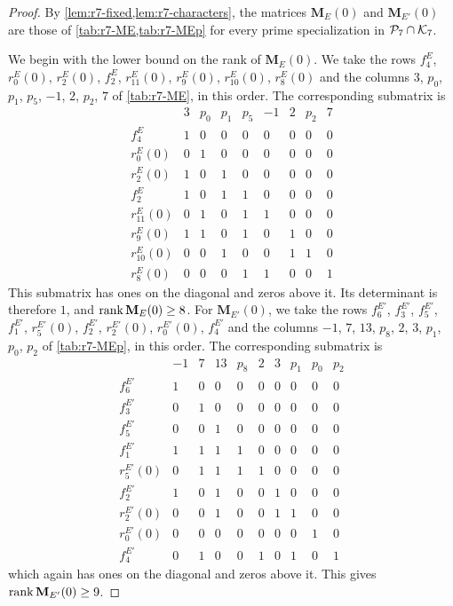 \begin{proof}
By \cref{lem:r7-fixed,lem:r7-characters}, the matrices
$\mathbf M_E(0)$ and $\mathbf M_{E'}(0)$ are those of
\cref{tab:r7-ME,tab:r7-MEp} for every prime specialization in
$\mathcal P_7\cap\mathcal K_7$.

We begin with the lower bound on the rank of $\mathbf M_E(0)$. We take the
rows $f^E_4$, $r^E_0(0)$, $r^E_2(0)$, $f^E_2$, $r^E_{11}(0)$, $r^E_9(0)$,
$r^E_{10}(0)$, $r^E_8(0)$ and the
columns $3$, $p_0$, $p_1$, $p_5$, $-1$, $2$, $p_2$, $7$ of
\cref{tab:r7-ME}, in this order. The corresponding submatrix is
\[
\begin{array}{c|cccccccc}
 & 3 & p_0 & p_1 & p_5 & -1 & 2 & p_2 & 7\\\hline
f^E_4 & 1 & 0 & 0 & 0 & 0 & 0 & 0 & 0 \\
r^{E}_0(0) & 0 & 1 & 0 & 0 & 0 & 0 & 0 & 0 \\
r^{E}_2(0) & 1 & 0 & 1 & 0 & 0 & 0 & 0 & 0 \\
f^E_2 & 1 & 0 & 1 & 1 & 0 & 0 & 0 & 0 \\
r^{E}_{11}(0) & 0 & 1 & 0 & 1 & 1 & 0 & 0 & 0 \\
r^{E}_9(0) & 1 & 1 & 0 & 1 & 0 & 1 & 0 & 0 \\
r^{E}_{10}(0) & 0 & 0 & 1 & 0 & 0 & 1 & 1 & 0 \\
r^{E}_8(0) & 0 & 0 & 0 & 1 & 1 & 0 & 0 & 1
\end{array}
\]
This submatrix has ones on the diagonal and zeros above it. Its
determinant is therefore $1$, and $\operatorname{rank}\mathbf M_E(0)\ge8$. For $\mathbf M_{E'}(0)$, we
take the rows $f^{E'}_6$, $f^{E'}_3$, $f^{E'}_5$, $f^{E'}_1$, $r^{E'}_5(0)$,
$f^{E'}_2$, $r^{E'}_2(0)$, $r^{E'}_0(0)$, $f^{E'}_4$ and the columns $-1$, $7$, $13$, $p_8$,
$2$, $3$, $p_1$, $p_0$, $p_2$ of \cref{tab:r7-MEp}, in this order. The
corresponding submatrix is
\[
\begin{array}{c|ccccccccc}
 & -1 & 7 & 13 & p_8 & 2 & 3 & p_1 & p_0 & p_2\\\hline
f^{E'}_6 & 1 & 0 & 0 & 0 & 0 & 0 & 0 & 0 & 0 \\
f^{E'}_3 & 0 & 1 & 0 & 0 & 0 & 0 & 0 & 0 & 0 \\
f^{E'}_5 & 0 & 0 & 1 & 0 & 0 & 0 & 0 & 0 & 0 \\
f^{E'}_1 & 1 & 1 & 1 & 1 & 0 & 0 & 0 & 0 & 0 \\
r^{E'}_5(0) & 0 & 1 & 1 & 1 & 1 & 0 & 0 & 0 & 0 \\
f^{E'}_2 & 1 & 0 & 1 & 0 & 0 & 1 & 0 & 0 & 0 \\
r^{E'}_2(0) & 0 & 0 & 1 & 0 & 0 & 1 & 1 & 0 & 0 \\
r^{E'}_0(0) & 0 & 0 & 0 & 0 & 0 & 0 & 0 & 1 & 0 \\
f^{E'}_4 & 0 & 1 & 0 & 0 & 1 & 0 & 1 & 0 & 1
\end{array}
\]
which again has ones on the diagonal and zeros above it. This gives
$\operatorname{rank}\mathbf M_{E'}(0)\ge9$.


\end{proof}
